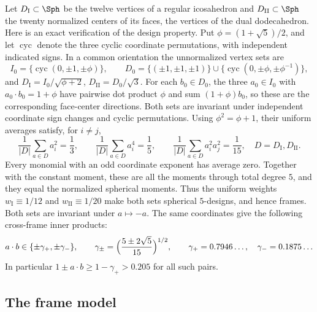 Let $D_{\mathrm I} \subset \Sph$ be the twelve vertices of a regular icosahedron and $D_{\mathrm{II}} \subset \Sph$ the twenty normalized centers of its faces, the vertices of the dual dodecahedron. Here is an exact verification of the design property. Put $\phi=(1+\sqrt5)/2$, and let $\operatorname{cyc}$ denote the three cyclic coordinate permutations, with independent indicated signs. In a common orientation the unnormalized vertex sets are
\begin{equation*}
I_0=\{\operatorname{cyc}(0,\pm1,\pm\phi)\},\qquad
D_0=\{(\pm1,\pm1,\pm1)\}\cup
\{\operatorname{cyc}(0,\pm\phi,\pm\phi^{-1})\},
\end{equation*}
and $D_{\mathrm I}=I_0/\sqrt{\phi+2}$, $D_{\mathrm{II}}=D_0/\sqrt3$. For each $b_0\in D_0$, the three $a_0\in I_0$ with $a_0\cdot b_0=1+\phi$ have pairwise dot product $\phi$ and sum $(1+\phi)b_0$, so these are the corresponding face-center directions. Both sets are invariant under independent coordinate sign changes and cyclic permutations. Using $\phi^2=\phi+1$, their uniform averages satisfy, for $i\ne j$,
\begin{equation*}
\frac1{|D|}\sum_{a\in D}a_i^2=\frac13,\qquad
\frac1{|D|}\sum_{a\in D}a_i^4=\frac15,\qquad
\frac1{|D|}\sum_{a\in D}a_i^2a_j^2=\frac1{15},
\quad D=D_{\mathrm I},D_{\mathrm{II}}.
\end{equation*}
Every monomial with an odd coordinate exponent has average zero. Together with the constant moment, these are all the moments through total degree $5$, and they equal the normalized spherical moments. Thus the uniform weights $w_{\mathrm I}\equiv1/12$ and $w_{\mathrm{II}}\equiv1/20$ make both sets spherical $5$-designs, and hence frames. Both sets are invariant under $a\mapsto-a$. The same coordinates give the following cross-frame inner products:
\begin{equation}\label{e:icodod}
a \cdot b \in \{ \pm \gamma_+, \pm \gamma_- \}, \qquad \gamma_\pm = \Bigl( \frac{5 \pm 2 \sqrt 5}{15} \Bigr)^{1/2}, \qquad \gamma_+ = 0.7946\ldots, \quad \gamma_- = 0.1875\ldots
\end{equation}
In particular $1 \pm a \cdot b \ge 1 - \gamma_+ > 0.205$ for all such pairs.

\subsection{The frame model}\label{s:framemodel}


